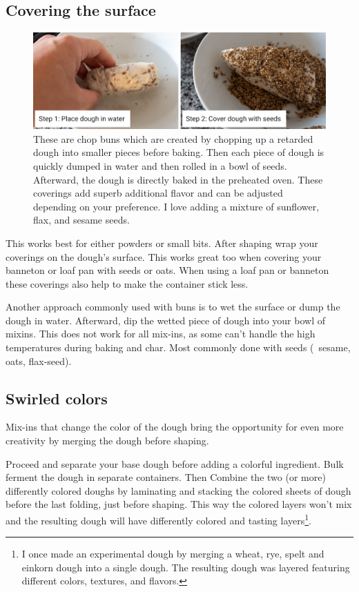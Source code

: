 \subsection{Covering the surface}

\begin{figure}[htb!]
  \includegraphics[width=\textwidth]{surface-seeds}
  \caption[Surface seeds]{These are chop buns which are created by chopping
    up a retarded dough into smaller pieces before baking. Then each piece of
    dough is quickly dumped in water and then rolled in a bowl of seeds.
    Afterward, the dough is directly baked in the preheated oven. These
    coverings add superb additional flavor and can be adjusted depending on
    your preference. I love adding a mixture of sunflower, flax, and
    sesame seeds.}%
\end{figure}

This works best for either powders or small bits. After shaping wrap your
coverings on the dough's surface. This works great too when covering your
banneton or loaf pan with seeds or oats. When using a loaf pan or banneton
these coverings also help to make the container stick less.

Another approach commonly used with buns is to wet the surface or dump the
dough in water. Afterward, dip the wetted piece of dough into your bowl of
mixins.  This does not work for all mix-ins, as some can't handle the high temperatures
during baking and char. Most commonly done with seeds (\eg~sesame, oats, flax-seed).

\subsection{Swirled colors}
Mix-ins that change the color of the dough bring the opportunity for even more
creativity by merging the dough before shaping.

Proceed and separate your base dough before adding a colorful ingredient. Bulk
ferment the dough in separate containers. Then Combine the two (or
more) differently colored doughs by laminating and stacking the colored sheets
of dough before the last folding, just before shaping. This way the colored
layers won't mix and the resulting dough will have differently colored and
tasting layers\footnote{I once made an experimental dough by merging a wheat,
rye, spelt and einkorn dough into a single dough. The resulting dough was
layered featuring different colors, textures, and flavors.}.
